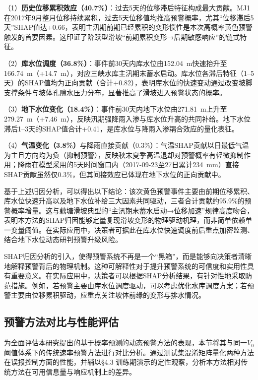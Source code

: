 \documentclass[12pt,a4paper]{article}
\begin{document}
    （1）\textbf{历史位移累积效应（40.7\%）}：过去5天的位移滞后特征构成最大贡献。MJ1在2017年9月整月位移持续累积，过去5天位移值均推高预警概率，尤其“位移滞后5天”SHAP值达+0.66，表明主汛期前期已经累积的变形惯性是本次高概率黄色预警触发的首要因素。这印证了阶跃型滑坡“前期累积变形→后期敏感响应”的链式特征。

    （2）\textbf{库水位调度（36.8\%）}：事件前30天内库水位由152.04~m快速抬升至166.74~m（+14.7~m），对应三峡水库主汛期末蓄水启动。库水位各滞后特征（1--5天）的SHAP值均为正向贡献（合计+0.82），表明库水位的快速变动通过改变坡脚支撑条件与坡体孔隙水压力分布，显著推高了滑坡进入预警状态的概率。

    （3）\textbf{地下水位变化（18.4\%）}：事件前30天内地下水位由271.81~m上升至279.27~m（+7.46~m），反映汛期强降雨入渗与库水位升高的共同补给。地下水位滞后1--3天的SHAP值合计+0.41，是库水位与降雨入渗耦合效应的量化表征。

    （4）\textbf{气温变化（3.8\%）}与降雨直接贡献（0.3\%）：气温SHAP贡献以日最低气温为主且方向均为负（抑制预警），反映秋末夏季高温退却对预警概率有轻微抑制作用；降雨在模型采用的5天时间窗口内（2017-09-23至27日累计234~mm）直接SHAP贡献虽然仅0.3\%，但其间接效应已体现在地下水位的正向贡献中。

基于上述归因分析，可以得出以下结论：该次黄色预警事件主要由前期位移累积、库水位快速升高以及地下水位补给三大因素共同驱动，三者合计贡献约95.9\%的预警概率增量。这与藕塘滑坡典型的“主汛期末蓄水启动→位移加速”规律高度吻合，表明本方法的SHAP归因能够定量复现滑坡变形的物理驱动机理，而非简单依赖单一变量阈值。在实际应用中，决策者可据此在库水位快速调度前后重点加密监测、结合地下水位动态研判预警升级风险。

SHAP归因分析的引入，使得预警系统不再是一个“黑箱”，而是能够向决策者清晰地解释预警背后的物理机制。这种可解释性对于提升预警系统的可信度和实用性具有重要意义。在实际应用中，决策者可以根据SHAP分析结果，有针对性地采取防范措施。例如，若预警主要由库水位调度驱动，可以考虑优化水库调度方案；若预警主要由位移累积驱动，应重点关注坡体前缘的变形与排水情况。

\subsection{预警方法对比与性能评估}

为全面评估本研究提出的基于概率预测的动态预警方法的表现，本节将其与同一$V_0$阈值体系下的传统速率预警方法进行对比分析。通过测试集混淆矩阵量化两种方法在误报控制方面的性能，并辅以\S4.3 训练期演示的定性观察，分析本方法相对传统方法在可用信息量与响应机制上的差异。
\end{document}

